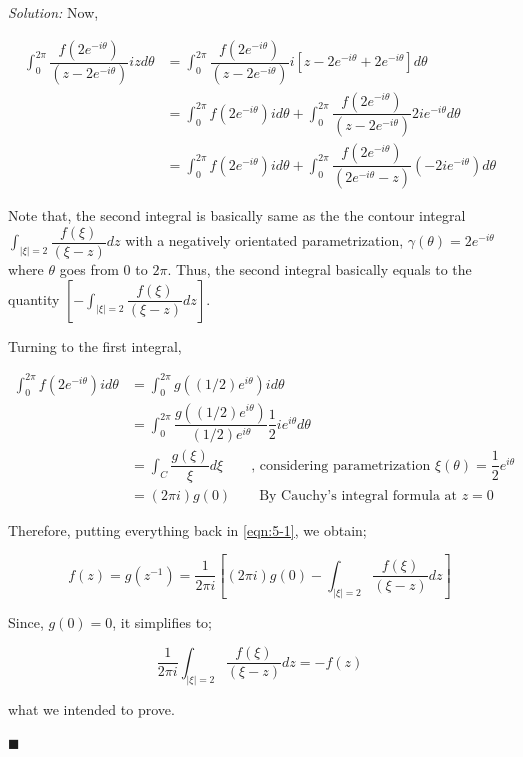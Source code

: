 \documentclass[12pt]{article}
\theoremstyle{definition}
\newenvironment{answer}{\textit{Solution: }\quad }{ \hfill $\blacksquare$}
\numberwithin{equation}{section}
\begin{document}
\begin{answer}
	Now, 

	\begin{align*}
		\int_{0}^{2\pi} \dfrac{f\left( 2e^{-i\theta} \right)}{(z - 2e^{-i\theta})} iz d\theta
		& = \int_{0}^{2\pi} \dfrac{f\left( 2e^{-i\theta} \right)}{(z - 2e^{-i\theta})} i\left[z - 2e^{-i\theta} + 2e^{-i\theta}\right] d\theta\\
		& = \int_{0}^{2\pi} f(2e^{-i\theta})i d\theta + \int_{0}^{2\pi} \dfrac{f(2e^{-i\theta})}{(z - 2e^{-i\theta})} 2ie^{-i\theta}d\theta\\
		& = \int_{0}^{2\pi} f(2e^{-i\theta})i d\theta + \int_{0}^{2\pi} \dfrac{f(2e^{-i\theta})}{(2e^{-i\theta} - z)} (-2ie^{-i\theta})d\theta
	\end{align*}

	Note that, the second integral is basically same as the the contour integral $\displaystyle\int_{\vert \xi \vert = 2} \dfrac{f(\xi)}{(\xi - z)}dz$ with a negatively orientated parametrization, $\gamma(\theta) = 2e^{-i\theta}$ where $\theta$ goes from $0$ to $2\pi$. Thus, the second integral basically equals to the quantity $\left[-\displaystyle\int_{\vert \xi \vert = 2} \dfrac{f(\xi)}{(\xi - z)}dz\right]$.

	Turning to the first integral,

	\begin{align*}
		\int_{0}^{2\pi} f(2e^{-i\theta}) i d\theta
		& = \int_{0}^{2\pi} g\left( (1/2) e^{i\theta} \right) i d\theta\\
		& = \int_{0}^{2\pi} \dfrac{g\left( (1/2) e^{i\theta} \right)}{(1/2)e^{i\theta}} \dfrac{1}{2}ie^{i\theta} d\theta\\
		& = \int_{C} \dfrac{g(\xi)}{\xi} d\xi \qquad \text{, considering parametrization } \xi(\theta) = \dfrac{1}{2}e^{i\theta}\\
		& = (2\pi i) g(0) \qquad \text{By Cauchy's integral formula at } z = 0
	\end{align*}

	Therefore, putting everything back in \cref{eqn:5-1}, we obtain;

	$$
	f(z) = g(z^{-1}) = \dfrac{1}{2\pi i} \left[ (2\pi i) g(0) - \int_{\vert \xi \vert = 2} \dfrac{f(\xi)}{(\xi - z)}dz \right]
	$$

	Since, $g(0) = 0$, it simplifies to;

	$$
	\dfrac{1}{2\pi i}\int_{\vert \xi \vert = 2} \dfrac{f(\xi)}{(\xi - z)}dz = -f(z)
	$$

	what we intended to prove.


\end{answer}
\end{document}
